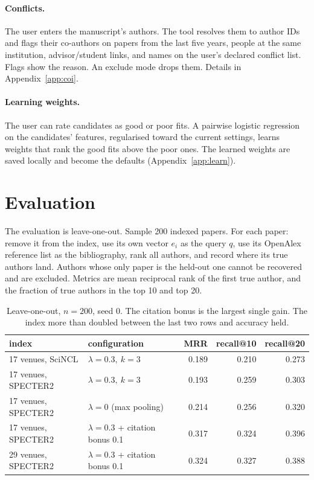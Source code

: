 \documentclass[11pt]{article}
\begin{document}
\paragraph{Conflicts.} The user enters the manuscript's authors. The tool resolves them to author IDs and flags their co-authors on papers from the last five years, people at the same institution, advisor/student links, and names on the user's declared conflict list. Flags show the reason. An exclude mode drops them. Details in Appendix~\ref{app:coi}.

\paragraph{Learning weights.} The user can rate candidates as good or poor fits. A pairwise logistic regression on the candidates' features, regularised toward the current settings, learns weights that rank the good fits above the poor ones. The learned weights are saved locally and become the defaults (Appendix~\ref{app:learn}).

\section{Evaluation}
The evaluation is leave-one-out. Sample 200 indexed papers. For each paper: remove it from the index, use its own vector $e_i$ as the query $q$, use its OpenAlex reference list as the bibliography, rank all authors, and record where its true authors land. Authors whose only paper is the held-out one cannot be recovered and are excluded. Metrics are mean reciprocal rank of the first true author, and the fraction of true authors in the top 10 and top 20.

\begin{table}[h]\centering\small
\begin{tabular}{llrrr}\toprule
index & configuration & MRR & recall@10 & recall@20 \\\midrule
17 venues, SciNCL & $\lambda{=}0.3,\ k{=}3$ & 0.189 & 0.210 & 0.273 \\
17 venues, SPECTER2 & $\lambda{=}0.3,\ k{=}3$ & 0.193 & 0.259 & 0.303 \\
17 venues, SPECTER2 & $\lambda{=}0$ (max pooling) & 0.214 & 0.256 & 0.320 \\
17 venues, SPECTER2 & $\lambda{=}0.3$ + citation bonus 0.1 & 0.317 & 0.324 & 0.396 \\
29 venues, SPECTER2 & $\lambda{=}0.3$ + citation bonus 0.1 & 0.324 & 0.327 & 0.388 \\
\bottomrule\end{tabular}
\caption{Leave-one-out, $n{=}200$, seed 0. The citation bonus is the largest single gain. The index more than doubled between the last two rows and accuracy held.}\end{table}
\end{document}
